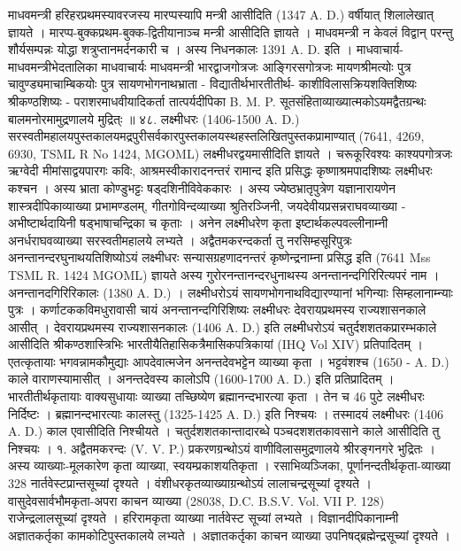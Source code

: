 माधवमन्त्री हरिहरप्रथमस्यावरजस्य मारप्पस्यापि मन्त्री आसीदिति (1347 A. D.) वर्षीयात् शिलालेखात् ज्ञायते । मारप्प-बुक्कप्रथम-बुक्क-द्वितीयानाञ्च मन्त्री आसीदिति ज्ञायते । माधवमन्त्री न केवलं विद्वान् परन्तु शौर्यसम्पन्नः योद्धा शत्रुप्तानमर्दनकारी च । अस्य निधनकालः  1391 A. D. इति ।
माधवाचार्य-माधवमन्त्रीभेदतालिका
माधवाचार्यः			माधवमन्त्री
भारद्वाजगोत्रजः					आङ्गिरसगोत्रजः
मायणश्रीमत्योः पुत्र					चावुण्ड्यमाचाम्बिकयोः पुत्र
सायणभोगनाथभ्राता						-
विद्यातीर्थभारतीतीर्थ-					काशीविलासक्रियशक्तिशिष्यः
श्रीकण्ठशिष्यः							-
पराशरमाधवीयादिकर्ता				तात्पर्यदीपिका B. M. P.
सूतसंहिताव्याख्यात्मकोऽयमद्वैतग्रन्थः 	बालमनोरमामुद्रणालये मुद्रित्ः ॥
४८. लक्ष्मीधरः (1406-1500 A. D.)
सरस्वतीमहालयपुस्तकालयमद्रपुरीसर्वकारपुस्तकालयस्थहस्तलिखितपुस्तकप्रामाण्यात् (7641, 4269, 6930, TSML R No 1424, MGOML) लक्ष्मीधरद्वयमासीदिति ज्ञायते । चरूकूरिवश्यः काश्यपगोत्रजः ऋग्वेदी मीमांसाद्वयपारगः कविः, आश्रमस्वीकारादनन्तरं रामान्द इति प्रसिद्धः कृष्णाश्रमपादशिष्यः लक्ष्मीधरः कश्चन । अस्य भ्राता कोण्डुभट्टः षड्दशिनीविवेककारः । अस्य ज्येष्ठभ्रातृपुत्रेण यज्ञानारायणेन शास्त्रदीपिकाव्याख्या प्रभामण्डलम्, गीतगोविन्दव्याख्या श्रुतिरञ्जिनी, जयदेवीयप्रसन्नराघवव्याख्या - अभीष्टार्थदायिनी षड्भाषाचन्द्रिका च कृताः । अनेन लक्ष्मीधरेण कृता इष्टार्थकल्पवल्लीनाम्नी अनर्धराघवव्याख्या सरस्वतीमहालये लभ्यते ।
अद्वैतमकरन्दकर्ता तु नरसिम्हसूरिपुत्रः अनन्तानन्दरघुनाथयतिशिष्योऽयं लक्ष्मीधरः सन्यासग्रहणादनन्तरं कृष्णेन्द्रनाम्ना प्रसिद्ध इति (7641 Mss TSML R. 1424 MGOML) ज्ञायते अस्य गुरोरनन्तानन्दरधुनाथस्य अनन्तानन्दगिरिरित्यपरं नाम । अनन्तानदगिरिरिकालः (1380 A. D.) । लक्ष्मीधरोऽयं सायणभोगनाथविद्यारण्यानां भगिन्याः सिम्हलानाम्न्याः पुत्रः । कर्णाटककविमधुरावासी चायं अनन्तानन्दगिरिशिष्यः लक्ष्मीधरः देवरायप्रथमस्य राज्यशासनकाले आसीत् । देवरायप्रथमस्य राज्यशासनकालः (1406 A. D.) इति लक्ष्मीधरोऽयं चतुर्दशशतकप्रारम्भकाले आसीदिति श्रीकण्ठशास्त्रिभिः भारतीयैतिहासिकत्रैमासिकपत्रिकायां (IHQ Vol XIV) प्रतिपादितम् ।
एतत्कृतायाः भगवन्नामकौमुद्याः आपदेवात्मजेन अनन्तदेवभट्टेन व्याख्या कृता । भट्टवंशश्च (1650 - A. D.) काले वाराणस्यामासीत् । अनन्तदेवस्य कालोऽपि (1600-1700 A. D.) इति प्रतिप्रादितम् । भारतीतीर्थकृतायाः वाक्यसुधायाः व्याख्या तच्छिष्येण ब्रह्मानन्दभारत्या कृता । तेन च 46 पुटे लक्ष्मीधरः निर्दिष्टः । ब्रह्मानन्दभारत्याः कालस्तु (1325-1425 A. D.) इति निश्चयः । तस्मादयं लक्ष्मीधरः (1406 A. D.) काल एवासीदिति निश्चीयते । चतुर्दशशतकान्तादारब्धे पञ्चदशशतकावसाने काले आसीदिति तु निश्चयः ।
१. अद्वैतमकरन्दः (V. V. P.)
प्रकरणग्रन्थोऽयं वाणीविलासमुद्रणालये श्रीरङ्गनगरे भुद्रितः । अस्य व्याख्याः-मूलकारेण कृता व्याख्या, स्वयम्प्रकाशयतिकृता । रसाभिव्यञ्जिका, पूर्णानन्दतीर्थकृता-व्याख्या 328 नार्तवेस्टप्रान्तसूच्यां दृश्यते । वंशीधरकृतव्याख्याग्रन्थोऽयं लालाचन्द्रसूच्यां दृश्यते । वासुदेवसार्वभौमकृता-अपरा काचन व्याख्या (28038, D.C. B.S.V. Vol. VII P. 128) राजेन्द्रलालसूच्यां दृश्यते । हरिरामकृता व्याख्या नार्तवेस्ट सूच्यां लभ्यते । विज्ञानदीपिकानाम्नी अज्ञातकर्तृका कामकोटिपुस्तकालये लभ्यते । अज्ञातकर्तृका काचन व्याख्या उपनिषद्ब्रह्मेन्द्रसूच्यां दृश्यते ।
